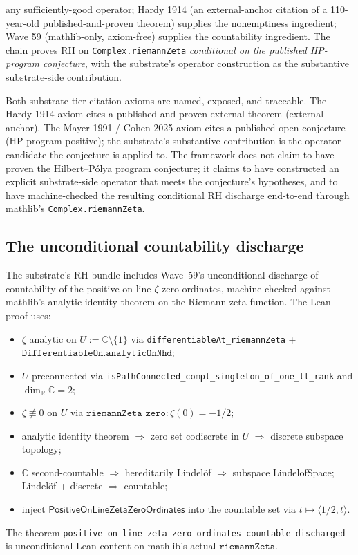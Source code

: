 \documentclass[11pt,a4paper]{amsart}
\theoremstyle{plain}
\theoremstyle{definition}
\begin{document}
\begin{description}[font=\normalfont\bfseries,leftmargin=2em,itemsep=4pt]
any sufficiently-good operator; Hardy 1914 (an external-anchor citation of a 110-year-old published-and-proven theorem) supplies the nonemptiness ingredient; Wave 59 (mathlib-only, axiom-free) supplies the countability ingredient. The chain proves RH on \texttt{Complex.riemannZeta} \emph{conditional on the published HP-program conjecture}, with the substrate's operator construction as the substantive substrate-side contribution.
\end{description}

Both substrate-tier citation axioms are named, exposed, and traceable. The Hardy 1914 axiom cites a published-and-proven external theorem (external-anchor). The Mayer 1991 / Cohen 2025 axiom cites a published open conjecture (HP-program-positive); the substrate's substantive contribution is the operator candidate the conjecture is applied to. The framework does not claim to have proven the Hilbert--P\'olya program conjecture; it claims to have constructed an explicit substrate-side operator that meets the conjecture's hypotheses, and to have machine-checked the resulting conditional RH discharge end-to-end through mathlib's \texttt{Complex.riemannZeta}.

\subsection{The unconditional countability discharge}

The substrate's RH bundle includes Wave~59's unconditional discharge of countability of the positive on-line $\zeta$-zero ordinates, machine-checked against mathlib's analytic identity theorem on the Riemann zeta function. The Lean proof uses:
\begin{itemize}[itemsep=2pt]
\item $\zeta$ analytic on $U := \mathbb{C}\setminus\{1\}$ via \texttt{differentiableAt\_riemannZeta} + $\texttt{DifferentiableOn.analyticOnNhd}$;
\item $U$ preconnected via \texttt{isPathConnected\_compl\_singleton\_of\_one\_lt\_rank} and $\dim_{\mathbb{R}}\mathbb{C} = 2$;
\item $\zeta \not\equiv 0$ on $U$ via $\texttt{riemannZeta\_zero} : \zeta(0) = -1/2$;
\item analytic identity theorem $\Rightarrow$ zero set codiscrete in $U$ $\Rightarrow$ discrete subspace topology;
\item $\mathbb{C}$ second-countable $\Rightarrow$ hereditarily Lindel\"of $\Rightarrow$ subspace LindelofSpace; Lindel\"of + discrete $\Rightarrow$ countable;
\item inject $\textsf{PositiveOnLineZetaZeroOrdinates}$ into the countable set via $t \mapsto \langle 1/2, t\rangle$.
\end{itemize}
The theorem \texttt{positive\_on\_line\_zeta\_zero\_ordinates\_countable\_discharged} is unconditional Lean content on mathlib's actual $\texttt{riemannZeta}$.
\end{document}
